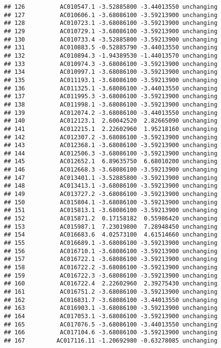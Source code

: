 \documentclass[]{article}
\begin{document}
\begin{verbatim}
## 126          AC010547.1 -3.52885800 -3.44013550 unchanging
## 127          AC010606.1 -3.68086100 -3.59213900 unchanging
## 128          AC010723.1 -3.68086100 -3.59213900 unchanging
## 129          AC010729.1 -3.68086100 -3.59213900 unchanging
## 130          AC010733.4 -3.52885800 -3.59213900 unchanging
## 131          AC010883.5 -0.52885790 -3.44013550 unchanging
## 132          AC010894.3 -1.94389530 -1.44013570 unchanging
## 133          AC010974.3 -3.68086100 -3.59213900 unchanging
## 134          AC010997.1 -3.68086100 -3.59213900 unchanging
## 135          AC011193.1 -3.68086100 -3.59213900 unchanging
## 136          AC011325.1 -3.68086100 -3.44013550 unchanging
## 137          AC011995.3 -3.68086100 -3.59213900 unchanging
## 138          AC011998.1 -3.68086100 -3.59213900 unchanging
## 139          AC012074.2 -3.68086100 -3.44013550 unchanging
## 140          AC012123.1  2.60042520  2.82665090 unchanging
## 141          AC012215.1  2.22602960  1.95218160 unchanging
## 142          AC012307.2 -3.68086100 -3.59213900 unchanging
## 143          AC012368.1 -3.68086100 -3.59213900 unchanging
## 144          AC012506.3 -3.68086100 -3.59213900 unchanging
## 145          AC012652.1  6.89635750  6.68010200 unchanging
## 146          AC012668.3 -3.68086100 -3.59213900 unchanging
## 147          AC013401.1 -3.52885800 -3.59213900 unchanging
## 148          AC013413.1 -3.68086100 -3.59213900 unchanging
## 149          AC013727.2 -3.68086100 -3.59213900 unchanging
## 150          AC015804.1 -3.68086100 -3.59213900 unchanging
## 151          AC015813.1 -3.68086100 -3.59213900 unchanging
## 152          AC015871.2  0.17158182  0.55986420 unchanging
## 153          AC015987.1  7.23019800  7.28948450 unchanging
## 154          AC016683.6  4.02573100  4.61514660 unchanging
## 155          AC016689.1 -3.68086100 -3.59213900 unchanging
## 156          AC016710.1 -3.68086100 -3.59213900 unchanging
## 157          AC016722.1 -3.68086100 -3.59213900 unchanging
## 158          AC016722.2 -3.68086100 -3.59213900 unchanging
## 159          AC016722.3 -3.68086100 -3.59213900 unchanging
## 160          AC016722.4  2.22602960  2.39275430 unchanging
## 161          AC016751.2 -3.68086100 -3.59213900 unchanging
## 162          AC016831.7 -3.68086100 -3.44013550 unchanging
## 163          AC016903.1 -3.68086100 -3.59213900 unchanging
## 164          AC017053.1 -3.68086100 -3.59213900 unchanging
## 165          AC017076.5 -3.68086100 -3.44013550 unchanging
## 166          AC017104.6 -3.68086100 -3.59213900 unchanging
## 167         AC017116.11 -1.20692980 -0.63278085 unchanging

\end{verbatim}
\end{document}
